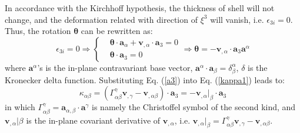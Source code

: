In accordance with the Kirchhoff hypothesis, the thickness of shell will not change, and the deformation related with direction of $\xi^3$ will vanish, i.e. $\epsilon_{3i}=0$. Thus, the rotation $\boldsymbol \theta$ can be rewritten as:
\begin{equation}\label{a3}
\epsilon_{3i} = 0 \Rightarrow
\left \{
\begin{split}
&\boldsymbol \theta \cdot \boldsymbol a_\alpha + \boldsymbol v_{,\alpha} \cdot \boldsymbol a_3 = 0 \\
&\boldsymbol \theta \cdot \boldsymbol a_3 = 0
\end{split}
\right .
\Rightarrow \boldsymbol \theta = - \boldsymbol v_{,\alpha} \cdot \boldsymbol a_3 \boldsymbol a^\alpha
\end{equation}
where $\boldsymbol a^\alpha$'s is the in-plane contravariant base vector, $\boldsymbol a^\alpha \cdot \boldsymbol a_\beta = \delta^\alpha_\beta$, $\delta$ is the Kronecker delta function. Substituting Eq. (\ref{a3}) into Eq. (\ref{kappa1}) leads to:
\begin{equation}
\kappa_{\alpha\beta} = (\Gamma^\gamma_{\alpha\beta} \boldsymbol v_{,\gamma} - \boldsymbol v_{,\alpha\beta}) \cdot \boldsymbol a_3 = - \boldsymbol v_{,\alpha}\vert_\beta \cdot \boldsymbol a_3
\end{equation}
in which $\Gamma^\gamma_{\alpha\beta} = \boldsymbol a_{\alpha,\beta} \cdot \boldsymbol a^\gamma$ is namely the Christoffel symbol of the second kind, and $\boldsymbol v_{,\alpha}\vert\beta$ is the in-plane covariant derivative of $\boldsymbol v_{,\alpha}$, i.e. $\boldsymbol v_{,\alpha}\vert_\beta = \Gamma^\gamma_{\alpha\beta}\boldsymbol v_{,\gamma} - \boldsymbol v_{,\alpha\beta}$.

